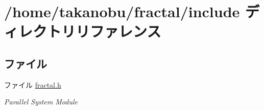\section{/home/takanobu/fractal/include ディレクトリリファレンス}
\label{dir_d44c64559bbebec7f509842c48db8b23}
\subsection*{ファイル}
\begin{DoxyCompactItemize}
\item 
ファイル \hyperlink{fractal_8h}{fractal.\+h}
\begin{DoxyCompactList}\small\item\em Parallel System Module \end{DoxyCompactList}\end{DoxyCompactItemize}
